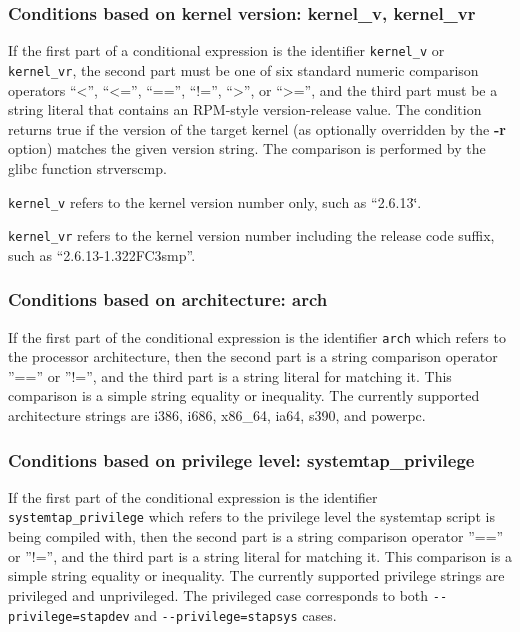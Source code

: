 \documentclass[twoside,english]{article}
\begin{document}
\subsubsection{Conditions based on kernel version: kernel\_v, kernel\_vr}
If the first part of a conditional expression is the identifier \texttt{kernel\_v}
or \texttt{kernel\_vr}, the second part must be one of six standard numeric
comparison operators {}``\textless'', {}``\textless ='', {}``=='', {}``!='', {}``\textgreater'',
or {}``\textgreater ='',
and the third part must be a string literal that contains an RPM-style version-release
value. The condition returns true if the version of the target kernel (as
optionally overridden by the \textbf{-r} option) matches the given version
string. The comparison is performed by the glibc function strverscmp.

\texttt{kernel\_v} refers to the kernel version number only, such as {}``2.6.13\char`\"{}.

\texttt{kernel\_vr} refers to the kernel version number including the release
code suffix, such as {}``2.6.13-1.322FC3smp''.


\subsubsection{Conditions based on architecture: arch}
If the first part of the conditional expression is the identifier \texttt{arch}
which refers to the processor architecture, then the second part is a string
comparison operator ''=='' or ''!='', and the third part is a string
literal for matching it. This comparison is a simple string equality or inequality.
The currently supported architecture strings are i386, i686, x86\_64, ia64,
s390, and powerpc.

\subsubsection{Conditions based on privilege level: systemtap\_privilege}
If the first part of the conditional expression is the identifier
\texttt{systemtap\_privilege} which refers to the privilege level the
systemtap script is being compiled with, then the second part is a
string comparison operator ''=='' or ''!='', and the third part is a
string literal for matching it. This comparison is a simple string
equality or inequality.  The currently supported privilege strings are
privileged and unprivileged. The privileged case corresponds to both
\verb+--privilege=stapdev+ and \verb+--privilege=stapsys+ cases.
\end{document}
